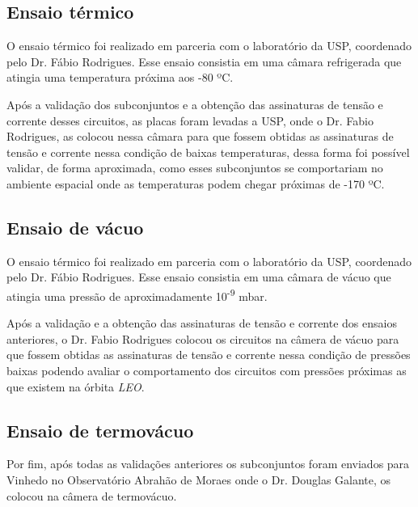 \documentclass[
	12pt,				%
	openright,			%
	oneside,			%
	a4paper,			%
	english,			%
	french,				%
	spanish,			%
	brazil,				%
	oldfontcommands
	]{abntex2}
\begin{document}
	
\subsection[Ensaio térmico]{Ensaio térmico}

	O ensaio térmico foi realizado em parceria com o laboratório da USP, coordenado pelo Dr. Fábio Rodrigues. Esse ensaio consistia em uma câmara refrigerada que atingia uma temperatura próxima aos -80 ºC. 
	
	Após a validação dos subconjuntos e a obtenção das assinaturas de tensão e corrente desses circuitos, as placas foram levadas a USP, onde o Dr. Fabio Rodrigues, as colocou nessa câmara para que fossem obtidas as assinaturas de tensão e corrente nessa condição de baixas temperaturas, dessa forma foi possível validar, de forma aproximada, como esses subconjuntos se comportariam no ambiente espacial onde as temperaturas podem chegar próximas de -170 ºC.

\subsection[Ensaio de vácuo]{Ensaio de vácuo}	

	O ensaio térmico foi realizado em parceria com o laboratório da USP, coordenado pelo Dr. Fábio Rodrigues. Esse ensaio consistia em uma câmara de vácuo que atingia uma pressão de aproximadamente 10\textsuperscript{-9} mbar. 
	
	Após a validação e a obtenção das assinaturas de tensão e corrente dos ensaios anteriores, o Dr. Fabio Rodrigues colocou os circuitos na câmera de vácuo para que fossem obtidas as assinaturas de tensão e corrente nessa condição de pressões baixas podendo avaliar o comportamento dos circuitos com pressões próximas as que existem na órbita \textit{LEO}.
	
\subsection[Ensaio de termovácuo]{Ensaio de termovácuo}

	Por fim, após todas as validações anteriores os subconjuntos foram enviados para Vinhedo no Observatório Abrahão de Moraes onde o Dr. Douglas Galante, os colocou na câmera de termovácuo.
	
\end{document}
